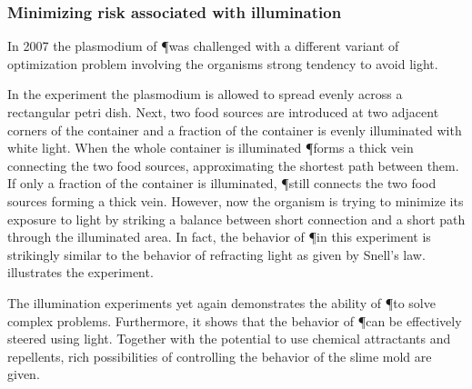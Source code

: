 			\FloatBarrier

		\subsubsection{Minimizing risk associated with illumination}

			In 2007 the plasmodium of \P was challenged with a different variant of optimization problem involving the organisms strong tendency to avoid light. 

			In the experiment the plasmodium is allowed to spread evenly across a rectangular petri dish. Next, two food sources are introduced at two adjacent corners of the container and a fraction of the container is evenly illuminated with white light. When the whole container is illuminated \P forms a thick vein connecting the two food sources, approximating the shortest path between them. If only a fraction of the container is illuminated, \P still connects the two food sources forming a thick vein. However, now the organism is trying to minimize its exposure to light by striking a balance between short connection and a short path through the illuminated area. In fact, the behavior of \P in this experiment is strikingly similar to the behavior of refracting light as given by Snell's law.  illustrates the experiment.

			The illumination experiments yet again demonstrates the ability of \P to solve complex problems. Furthermore, it shows that the behavior of \P can be effectively steered using light. Together with the potential to use chemical attractants and repellents, rich possibilities of controlling the behavior of the slime mold are given.

